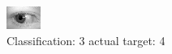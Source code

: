 \begin{figure}[h!]
\begin{center}
\includegraphics[width=0.60\columnwidth]{figures/ID742_class_3_target_4.png}
\end{center}
\caption{ Classification: 3 actual target: 4}
\label{fig:ID742_class_3_target_4}
\end{figure}
